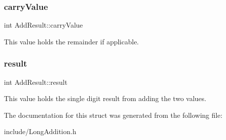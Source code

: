\subsubsection{carry\+Value}
{\footnotesize\ttfamily int Add\+Result\+::carry\+Value}



This value holds the remainder if applicable. 

\mbox{\label{struct_add_result_ae66aa315e5c177a4d85abe034b59cc58}} 
\subsubsection{result}
{\footnotesize\ttfamily int Add\+Result\+::result}



This value holds the single digit result from adding the two values. 



The documentation for this struct was generated from the following file\+:\begin{DoxyCompactItemize}
\item 
include/Long\+Addition.\+h\end{DoxyCompactItemize}
